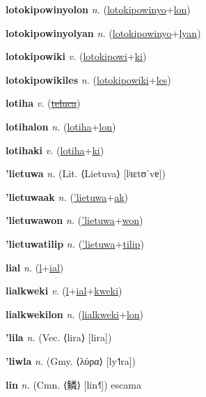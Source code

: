 \textbf{\hypertarget{lotokipowinyolon}{lotokipowinyolon}} \textit{n.} (\hyperlink{lotokipowinyo}{lotokipowinyo}+\allowbreak \hyperlink{lon}{lon})


\textbf{\hypertarget{lotokipowinyolyan}{lotokipowinyolyan}} \textit{n.} (\hyperlink{lotokipowinyo}{lotokipowinyo}+\allowbreak \hyperlink{lyan}{lyan})


\textbf{\hypertarget{lotokipowiki}{lotokipowiki}} \textit{v.} (\hyperlink{lotokipowi}{lotokipowi}+\allowbreak \hyperlink{ki}{ki})


\textbf{\hypertarget{lotokipowikiles}{lotokipowikiles}} \textit{n.} (\hyperlink{lotokipowiki}{lotokipowiki}+\allowbreak \hyperlink{les}{les})


\textbf{\hypertarget{lotiha}{lotiha}} \textit{v.} (\hyperlink{teluca}{\sout{teluca}})


\textbf{\hypertarget{lotihalon}{lotihalon}} \textit{n.} (\hyperlink{lotiha}{lotiha}+\allowbreak \hyperlink{lon}{lon})


\textbf{\hypertarget{lotihaki}{lotihaki}} \textit{v.} (\hyperlink{lotiha}{lotiha}+\allowbreak \hyperlink{ki}{ki})


\textbf{\hypertarget{'lietuwa}{'lietuwa}} \textit{n.} (Lit. ⟨Lietuva⟩ [lʲɪɛtʊˈvɐ])


\textbf{\hypertarget{'lietuwaak}{'lietuwaak}} \textit{n.} (\hyperlink{'lietuwa}{'lietuwa}+\allowbreak \hyperlink{ak}{ak})


\textbf{\hypertarget{'lietuwawon}{'lietuwawon}} \textit{n.} (\hyperlink{'lietuwa}{'lietuwa}+\allowbreak \hyperlink{won}{won})


\textbf{\hypertarget{'lietuwatilip}{'lietuwatilip}} \textit{n.} (\hyperlink{'lietuwa}{'lietuwa}+\allowbreak \hyperlink{tilip}{tilip})


\textbf{\hypertarget{lial}{lial}} \textit{n.} (\hyperlink{l}{l}+\allowbreak \hyperlink{ial}{ial})


\textbf{\hypertarget{lialkweki}{lialkweki}} \textit{v.} (\hyperlink{l}{l}+\allowbreak \hyperlink{ial}{ial}+\allowbreak \hyperlink{kweki}{kweki})


\textbf{\hypertarget{lialkwekilon}{lialkwekilon}} \textit{n.} (\hyperlink{lialkweki}{lialkweki}+\allowbreak \hyperlink{lon}{lon})


\textbf{\hypertarget{'lila}{'lila}} \textit{n.} (Vec. ⟨lira⟩ [lira])


\textbf{\hypertarget{'liwla}{'liwla}} \textit{n.} (Gmy. ⟨λύρα⟩ [ly˦ra])


\textbf{\hypertarget{lin}{lin}} \textit{n.} (Cmn. ⟨{\chinese{}鳞}⟩ [lin˧˥])
escama

